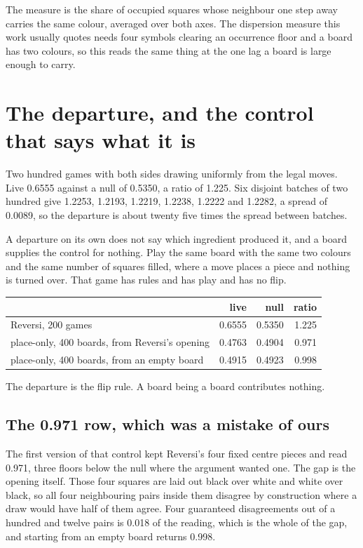 The measure is the share of occupied squares whose neighbour one step away carries the same colour,
averaged over both axes. The dispersion measure this work usually quotes needs four symbols clearing
an occurrence floor and a board has two colours, so this reads the same thing at the one lag a board
is large enough to carry.

\section{The departure, and the control that says what it is}

Two hundred games with both sides drawing uniformly from the legal moves. Live 0.6555 against a null
of 0.5350, a ratio of 1.225. Six disjoint batches of two hundred give 1.2253, 1.2193, 1.2219, 1.2238,
1.2222 and 1.2282, a spread of 0.0089, so the departure is about twenty five times the spread between
batches.

A departure on its own does not say which ingredient produced it, and a board supplies the control
for nothing. Play the same board with the same two colours and the same number of squares filled,
where a move places a piece and nothing is turned over. That game has rules and has play and has no
flip.

\begin{center}
\begin{tabular}{@{}lrrr@{}}
\toprule
& live & null & ratio \\
\midrule
Reversi, 200 games & 0.6555 & 0.5350 & 1.225 \\
place-only, 400 boards, from Reversi's opening & 0.4763 & 0.4904 & 0.971 \\
place-only, 400 boards, from an empty board & 0.4915 & 0.4923 & 0.998 \\
\bottomrule
\end{tabular}
\end{center}

The departure is the flip rule. A board being a board contributes nothing.

\subsection{The 0.971 row, which was a mistake of ours}

The first version of that control kept Reversi's four fixed centre pieces and read 0.971, three
floors below the null where the argument wanted one. The gap is the opening itself. Those four
squares are laid out black over white and white over black, so all four neighbouring pairs inside
them disagree by construction where a draw would have half of them agree. Four guaranteed
disagreements out of a hundred and twelve pairs is 0.018 of the reading, which is the whole of the
gap, and starting from an empty board returns 0.998.

